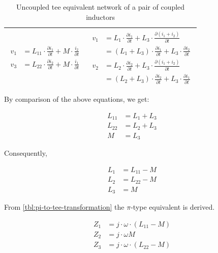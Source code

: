 \begin{table}[H]
\begin{tabular}{ | c | c | }
\begin{minipage}{.4\textwidth}
         {\begin{align}
           v_1 &= L_{11} \cdot  \frac{\partial i_1}{\partial t}  + M \cdot \frac{i_2}{\partial t}\\
           v_3 &= L_{22} \cdot  \frac{\partial i_2}{\partial t}  + M \cdot \frac{i_1}{\partial t}
         \end{align}}
    \end{minipage}
    &
        \begin{minipage}{.4\textwidth}
         {\begin{align}
           v_1 &= L_1 \cdot \frac{\partial i_1}{\partial t} + L_3 \cdot \frac{\partial (i_1 + i_2)}{\partial t} \\
               &= (L_1 + L_3) \cdot \frac{\partial i_1}{\partial t} + L_3 \cdot \frac{\partial i_2}{\partial t} \\
           v_2 &= L_2 \cdot \frac{\partial i_2}{\partial t} + L_3 \cdot \frac{\partial (i_1 + i_2)}{\partial t} \\
               &= (L_2 + L_3) \cdot \frac{\partial i_2}{\partial t} + L_3 \cdot \frac{\partial i_1}{\partial t}
         \end{align}}
    \end{minipage}
    \\ \hline
  \end{tabular}
  \caption{Uncoupled tee equivalent network of a pair of coupled inductors}
  \label{tbl:tee-coupled-inductors}
\end{table}

\noindent By comparison of the above equations, we get:

\begin{align}
   L_{11} &= L_1 + L_3 \\
   L_{22} &= L_2 + L_3 \\
   M &= L_3
\end{align}

\noindent Consequently,

\begin{align}
   L_1 &= L_{11} - M \\
   L_2 &= L_{22} - M \\
   L_3 &= M
\end{align}

\noindent From \ref{tbl:pi-to-tee-transformation} the $\pi$-type equivalent is derived.

\begin{align}
   Z_1 &= j \cdot \omega \cdot (L_{11} - M) \\
   Z_2 &= j \cdot \omega M \\
   Z_3 &= j \cdot \omega \cdot (L_{22} - M)
\end{align}


